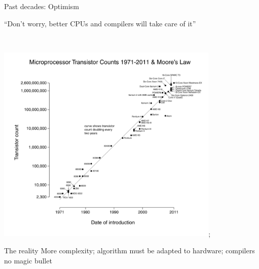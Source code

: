 \documentclass[sans,mathserif]{beamer}
\begin{document}
\begin{frame}{Past decades: Optimism}

``Don't worry, better CPUs and compilers will take care of it''

~

{\includegraphics[width=0.8\textwidth]{transistors.pdf}};
\end{frame}

\begin{frame}{The reality}
More complexity; algorithm must be adapted to hardware; compilers no magic bullet

~

  
\end{frame}
\end{document}
